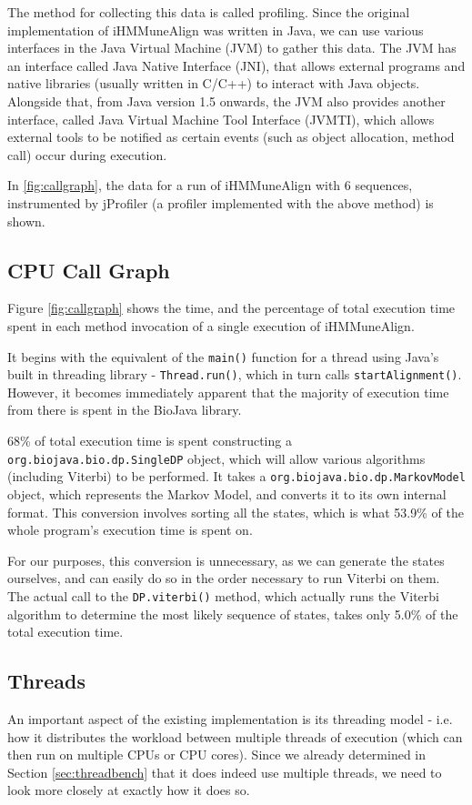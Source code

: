 The method for collecting this data is called profiling. Since the original implementation of iHMMuneAlign was written in Java, we can use various interfaces in the Java Virtual Machine (JVM) to gather this data. The JVM has an interface called Java Native Interface (JNI)\autocite{jni}, that allows external programs and native libraries (usually written in C/C++) to interact with Java objects. Alongside that, from Java version 1.5 onwards, the JVM also provides another interface, called Java Virtual Machine Tool Interface (JVMTI), which allows external tools to be notified as certain events (such as object allocation, method call) occur during execution.

In \autoref{fig:callgraph}, the data for a run of iHMMuneAlign with 6 sequences, instrumented by jProfiler \autocite{jprofiler} (a profiler implemented with the above method) is shown.

\subsection{CPU Call Graph}
\label{sec:cpuprof}
Figure \autoref{fig:callgraph} shows the time, and the percentage of total execution time spent in each method invocation of a single execution of iHMMuneAlign.

It begins with the equivalent of the \texttt{main()} function for a thread using Java's built in threading library - \texttt{Thread.run()}, which in turn calls \texttt{startAlignment()}. However, it becomes immediately apparent that the majority of execution time from there is spent in the BioJava library.

68\% of total execution time is spent constructing a \texttt{org.biojava.bio.dp.SingleDP} object, which will allow various algorithms (including Viterbi) to be performed. It takes a \texttt{org.biojava.bio.dp.MarkovModel} object, which represents the Markov Model, and converts it to its own internal format. This conversion involves sorting all the states, which is what 53.9\% of the whole program's execution time is spent on.

For our purposes, this conversion is unnecessary, as we can generate the states ourselves, and can easily do so in the order necessary to run Viterbi on them. The actual call to the \texttt{DP.viterbi()} method, which actually runs the Viterbi algorithm to determine the most likely sequence of states, takes only 5.0\% of the total execution time.

\subsection{Threads}
\label{sec:threadprof}
An important aspect of the existing implementation is its threading model - i.e. how it distributes the workload between multiple threads of execution (which can then run on multiple CPUs or CPU cores). Since we already determined in Section \ref{sec:threadbench} that it does indeed use multiple threads, we need to look more closely at exactly how it does so.

